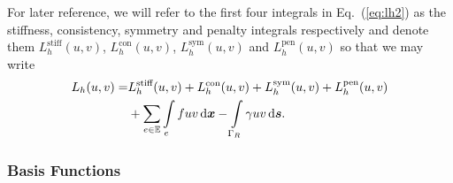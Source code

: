For later reference, we will refer to the first four integrals in
Eq.~(\ref{eq:lh2}) as the stiffness, consistency, symmetry and
penalty integrals respectively and denote them
$L^{\text{stiff}}_h(u,v)$, $L^{\text{con}}_h(u,v)$,
$L^{\text{sym}}_h(u,v)$ and $L^{\text{pen}}_h(u,v)$ so that we may
write
%
\begin{align}
  \nonumber
  \label{eq:lh3}
  L_h(u,v) = &L^{\text{stiff}}_h(u,v) + L^{\text{con}}_h(u,v) + L^{\text{sym}}_h(u,v) 
  + L^{\text{pen}}_h(u,v)\\
  &+ \sum_{e\in\mathbb{E}}\int\displaylimits_{e}f u v \,\mathrm{d}\boldsymbol{x} - \int\displaylimits_{\Gamma_R} \gamma u v \,\mathrm{d}\boldsymbol{s}.
\end{align}
%




\subsubsection{Basis Functions}


